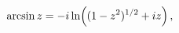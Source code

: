 \[\mathop{\mathrm{arcsin}\/}\nolimits z=-i\mathop{\ln\/}\nolimits\!\left((1-z^{2%
})^{1/2}+iz\right),\]